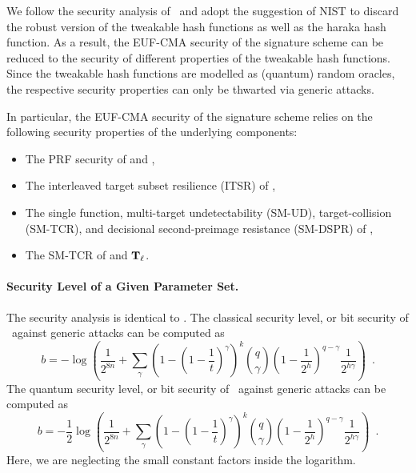 We follow the security analysis of \SPHINCSP\ and adopt the suggestion of NIST \cite{nistdecision} to discard the robust version of the tweakable hash functions as well as the \textsf{haraka} hash function. As a result, the EUF-CMA security of the signature scheme can be reduced to the security of different properties of the tweakable hash functions. Since the tweakable hash functions are modelled as (quantum) random oracles, the respective security properties can only be thwarted via generic attacks.

In particular, the EUF-CMA security of the signature scheme relies on the following security properties of the underlying components:

\begin{itemize}
    \item The PRF security of \PRF and \PRFmsg,

    \item The interleaved target subset resilience (ITSR) of \hashmsg,

    \item The single function, multi-target undetectability (SM-UD), target-collision (SM-TCR), and decisional second-preimage resistance (SM-DSPR) of \hashF,

    \item The SM-TCR of \hashH and $\mathbf{T}_\ell$.
\end{itemize}


\paragraph{Security Level of a Given Parameter Set.}

The security analysis is identical to \SPHINCSP. The classical security level, or bit security of \SPHINCSA\ against generic attacks can be computed as
$$
b=-\log\left(
    \frac{1}{2^{8n}}+
    \sum_{\gamma}
        \left(1-\left(1-\frac{1}{t}\right)^{\gamma}\right)^{k}
        \binom{q}{\gamma}
        \left(1-\frac{1}{2^{h}}\right)^{q-\gamma}
        \frac{1}{2^{h\gamma}}
    \right) \enspace.
$$
The quantum security level, or bit security of \SPHINCSA\ against generic attacks can be computed as
$$
b=-\frac{1}{2}\log\left(
    \frac{1}{2^{8n}}+
    \sum_{\gamma}
        \left(1-\left(1-\frac{1}{t}\right)^{\gamma}\right)^{k}
        \binom{q}{\gamma}
        \left(1-\frac{1}{2^{h}}\right)^{q-\gamma}
        \frac{1}{2^{h\gamma}}
    \right) \enspace.
$$
Here, we are neglecting the small constant factors inside the logarithm. 

